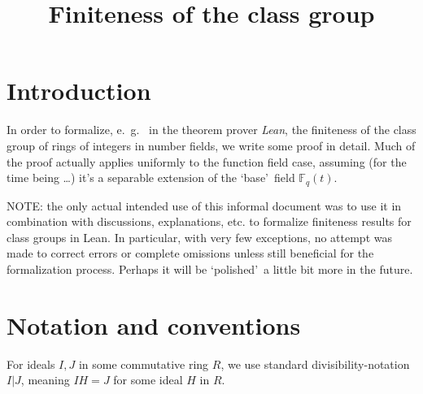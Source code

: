 \documentclass{amsart}
\newcommand{\N}{\mathbb{N}}
\newcommand{\Fq}{\mathbb{F}_q}
\begin{document}
\newtheorem{theorem}{Theorem}[section]
\newtheorem{lemma}[theorem]{Lemma}
\newtheorem{proposition}[theorem]{Proposition}
\newtheorem{algorithm}[theorem]{Algorithm}
\newtheorem{corollary}[theorem]{Corollary}
\newtheorem*{conjecture}{Conjecture}

\theoremstyle{definition}
\newtheorem{definition}[theorem]{Definition}
\newtheorem{example}[theorem]{Example}

\theoremstyle{remark}
\newtheorem{remark}[theorem]{Remark}


\title{Finiteness of the class group}

\maketitle

\section{Introduction}\label{intro}

In order to formalize, e.~g.~ in the theorem prover \emph{Lean}, the finiteness of the class group of rings of integers in number fields, we write some proof in detail. Much of the proof actually applies uniformly to the function field case, assuming (for the time being \ldots) it's a separable extension of the \lq base\rq\ field $\Fq(t)$.

NOTE: the only actual intended use of this informal document was to use it in combination with discussions, explanations, etc. to formalize finiteness results for class groups in Lean. In particular, with very few exceptions, no attempt was made to correct errors or complete omissions unless still beneficial for the formalization process.
Perhaps it will be \lq polished\rq\ a little bit more in the future.


\section{Notation and conventions}\label{notation}


For ideals $I,J$ in some commutative ring $R$, we use standard divisibility-notation $I|J$, meaning $IH=J$ for some ideal $H$ in $R$.



\end{document}
